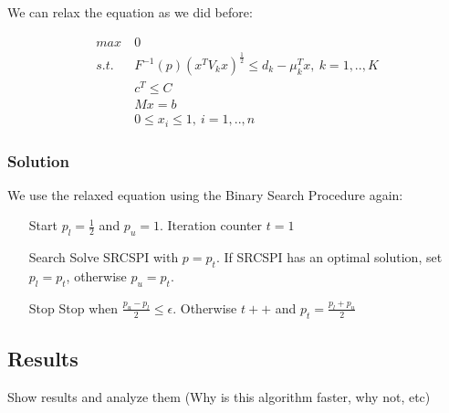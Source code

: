 \documentclass{beamer}
\begin{document}
\begin{frame}

We can relax the equation as we did before:

\begin{align*}
 max\ & 0\\
 s.t.\ & F^{-1}(p)(x^TV_kx)^{\frac{1}{2}} \leq d_k - \mu_k^Tx,\ k=1,..,K \\
 & c^T \leq C \\
 & Mx = b \\
 & 0 \leq x_i \leq 1,\ i=1,..,n
\end{align*}
\end{frame}

\subsubsection{Solution}

\begin{frame}

We use the relaxed equation using the Binary Search Procedure again:

\begin{itemize}
\item[Start] $p_l = \frac{1}{2}$ and $p_u = 1$. Iteration counter $t = 1$
\item[Search] Solve SRCSPI with $p = p_t$. If SRCSPI has an optimal solution, set $p_l = p_t$, otherwise $p_u = p_t$.
\item[Stop] Stop when $\frac{p_u - p_l}{2} \leq \epsilon$. Otherwise $t++$ and $p_t = \frac{p_l + p_u}{2} $
\end{itemize}
\end{frame}

\subsection{Results}
\begin{frame}
Show results and analyze them (Why is this algorithm faster, why not, etc)
\end{frame}
\end{document}
